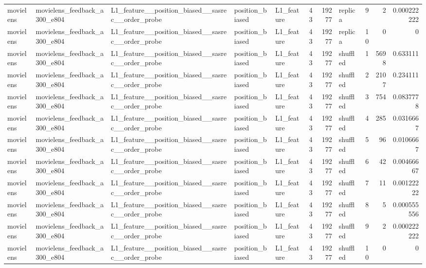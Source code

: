 \begin{table}[htbp!]
\begin{tabular}{lllllrrlrrr}
movielens & movielens\_feedback\_a300\_e804 & L1\_feature\_\_position\_biased\_\_sasrec\_\_order\_probe & position\_biased & L1\_feature & 43 & 19277 & replica & 9 & 2 & 0.000222222 \\
movielens & movielens\_feedback\_a300\_e804 & L1\_feature\_\_position\_biased\_\_sasrec\_\_order\_probe & position\_biased & L1\_feature & 43 & 19277 & replica & 10 & 0 & 0 \\
movielens & movielens\_feedback\_a300\_e804 & L1\_feature\_\_position\_biased\_\_sasrec\_\_order\_probe & position\_biased & L1\_feature & 43 & 19277 & shuffled & 1 & 5698 & 0.633111 \\
movielens & movielens\_feedback\_a300\_e804 & L1\_feature\_\_position\_biased\_\_sasrec\_\_order\_probe & position\_biased & L1\_feature & 43 & 19277 & shuffled & 2 & 2107 & 0.234111 \\
movielens & movielens\_feedback\_a300\_e804 & L1\_feature\_\_position\_biased\_\_sasrec\_\_order\_probe & position\_biased & L1\_feature & 43 & 19277 & shuffled & 3 & 754 & 0.0837778 \\
movielens & movielens\_feedback\_a300\_e804 & L1\_feature\_\_position\_biased\_\_sasrec\_\_order\_probe & position\_biased & L1\_feature & 43 & 19277 & shuffled & 4 & 285 & 0.0316667 \\
movielens & movielens\_feedback\_a300\_e804 & L1\_feature\_\_position\_biased\_\_sasrec\_\_order\_probe & position\_biased & L1\_feature & 43 & 19277 & shuffled & 5 & 96 & 0.0106667 \\
movielens & movielens\_feedback\_a300\_e804 & L1\_feature\_\_position\_biased\_\_sasrec\_\_order\_probe & position\_biased & L1\_feature & 43 & 19277 & shuffled & 6 & 42 & 0.00466667 \\
movielens & movielens\_feedback\_a300\_e804 & L1\_feature\_\_position\_biased\_\_sasrec\_\_order\_probe & position\_biased & L1\_feature & 43 & 19277 & shuffled & 7 & 11 & 0.00122222 \\
movielens & movielens\_feedback\_a300\_e804 & L1\_feature\_\_position\_biased\_\_sasrec\_\_order\_probe & position\_biased & L1\_feature & 43 & 19277 & shuffled & 8 & 5 & 0.000555556 \\
movielens & movielens\_feedback\_a300\_e804 & L1\_feature\_\_position\_biased\_\_sasrec\_\_order\_probe & position\_biased & L1\_feature & 43 & 19277 & shuffled & 9 & 2 & 0.000222222 \\
movielens & movielens\_feedback\_a300\_e804 & L1\_feature\_\_position\_biased\_\_sasrec\_\_order\_probe & position\_biased & L1\_feature & 43 & 19277 & shuffled & 10 & 0 & 0 \\

\end{tabular}
\end{table}
